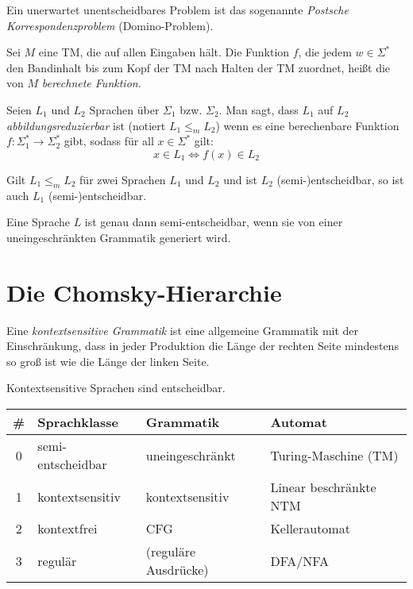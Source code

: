 \documentclass{cheat-sheet}
\begin{document}
\begin{bem}
Ein unerwartet unentscheidbares Problem ist das sogenannte \emph{Postsche Korrespondenzproblem} (Domino-Problem).
\end{bem}

\begin{defn}
Sei $M$ eine TM, die auf allen Eingaben hält. Die Funktion $f$, die jedem $w \in \Sigma^{*}$ den Bandinhalt bis zum Kopf der TM nach Halten der TM zuordnet, heißt die von $M$ \emph{berechnete Funktion}.
\end{defn}

\begin{defn}
Seien $L_{1}$ und $L_{2}$ Sprachen über $\Sigma_{1}$ bzw. $\Sigma_{2}$. Man sagt, dass $L_{1}$ auf $L_{2}$ \emph{abbildungsreduzierbar} ist (notiert $L_{1} \le_{m} L_{2}$) wenn es eine berechenbare Funktion $f : \Sigma_{1}^{*} \to \Sigma_{2}^{*}$ gibt, sodass für all $x \in \Sigma^{*}$ gilt:
  \[ x \in L_{1} \Leftrightarrow f(x) \in L_{2} \]
\end{defn}

\begin{satz}
Gilt $L_{1} \le_{m} L_{2}$ für zwei Sprachen $L_{1}$ und $L_{2}$ und ist $L_{2}$ (semi-)entscheidbar, so ist auch $L_{1}$ (semi-)entscheidbar.
\end{satz}

\begin{satz}
Eine Sprache $L$ ist genau dann semi-entscheidbar, wenn sie von einer uneingeschränkten Grammatik generiert wird.
\end{satz}


\section{Die Chomsky-Hierarchie}

\begin{defn}
Eine \emph{kontextsensitive Grammatik} ist eine allgemeine Grammatik mit der Einschränkung, dass in jeder Produktion die Länge der rechten Seite mindestens so groß ist wie die Länge der linken Seite.
\end{defn}

\begin{satz}
Kontextsensitive Sprachen sind entscheidbar.
\end{satz}

\begin{center}
  \scriptsize
  \setlength{\tabcolsep}{2pt}
  \begin{tabular}{ c | l | l | l }
    \# & Sprachklasse & Grammatik & Automat \\
    \hline
    0 & semi-entscheidbar & uneingeschränkt & Turing-Maschine (TM) \\
    1 & kontextsensitiv & kontextsensitiv & Linear beschränkte NTM \\
    2 & kontextfrei & CFG & Kellerautomat \\
    3 & regulär & (reguläre Ausdrücke) & DFA/NFA
  \end{tabular}
\end{center}
\end{document}
